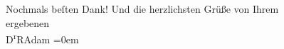 \pstart
           Nochmals beſten Dank! Und die herzlichsten Grüße von Ihrem{\\[\baselineskip]}ergebenen{\\[\baselineskip]}\spacefill\mbox{D\textsuperscript{r}RAdam}\pend
           \leftskip=0em{}\endnumbering{}  \newcommand{\dateiname}{L02315}\newcommand{\titel}{Robert Adam an Arthur Schnitzler, 8. 12. 1918}\newcommand{\editorInnen}{Martin Anton Müller und Gerd-Hermann Susen}
